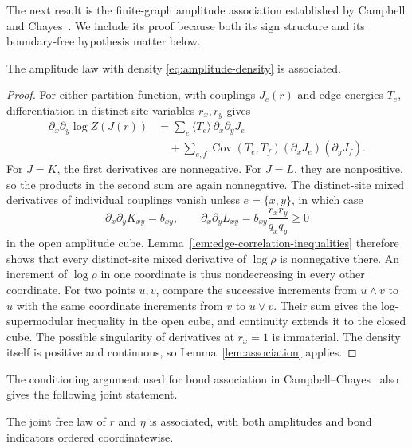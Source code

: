 The next result is the finite-graph amplitude association established
by Campbell and Chayes~\cite[Lemma~2]{CC}. We include its proof because
both its sign structure and its boundary-free hypothesis matter below.

\begin{lemma}\label{lem:amplitude-association}
The amplitude law with density \eqref{eq:amplitude-density} is associated.
\end{lemma}

\begin{proof}
For either partition function, with couplings $J_e(r)$ and edge
energies $T_e$, differentiation in distinct site variables $r_x,r_y$
gives
\begin{align*}
 \partial_x\partial_y\log Z(J(r))
 &=\sum_e\langle T_e\rangle\,\partial_x\partial_y J_e\\
 &\quad+\sum_{e,f}\operatorname{Cov}(T_e,T_f)
              (\partial_xJ_e)(\partial_yJ_f).
\end{align*}
For $J=K$, the first derivatives are nonnegative.  For $J=L$, they are
nonpositive, so the products in the second sum are again nonnegative.
The distinct-site mixed derivatives of individual couplings vanish
unless $e=\{x,y\}$, in which case
\[
 \partial_x\partial_y K_{xy}=b_{xy},
 \qquad
 \partial_x\partial_y L_{xy}
   =b_{xy}\frac{r_xr_y}{q_xq_y}\geq0
\]
in the open amplitude cube.  Lemma~\ref{lem:edge-correlation-inequalities}
therefore shows that every distinct-site mixed derivative of
$\log\rho$ is nonnegative there.  An increment of $\log\rho$ in one
coordinate is thus nondecreasing in every other coordinate.  For two
points $u,v$, compare the successive increments from $u\wedge v$ to
$u$ with the same coordinate increments from $v$ to $u\vee v$.
Their sum gives the log-supermodular inequality in the open cube,
and continuity extends it to the closed cube.  The possible singularity
of derivatives at $r_x=1$ is immaterial.  The density itself is positive
and continuous, so Lemma~\ref{lem:association} applies.
\end{proof}

The conditioning argument used for bond association in
Campbell--Chayes~\cite[Corollary~1]{CC} also gives the following joint
statement.

\begin{lemma}\label{lem:joint-association}
The joint free law of $r$ and $\eta$ is associated, with both amplitudes
and bond indicators ordered coordinatewise.
\end{lemma}

